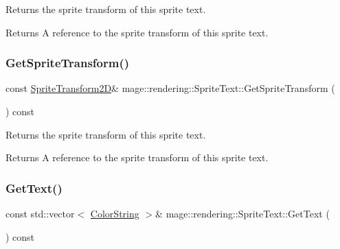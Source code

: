 Returns the sprite transform of this sprite text.

\begin{DoxyReturn}{Returns}
A reference to the sprite transform of this sprite text. 
\end{DoxyReturn}
\mbox{\label{classmage_1_1rendering_1_1_sprite_text_a6db14770931fa027175333cbf7761327}} 
\subsubsection{\texorpdfstring{Get\+Sprite\+Transform()}{GetSpriteTransform()}\hspace{0.1cm}{\footnotesize\ttfamily [2/2]}}
{\footnotesize\ttfamily const \mbox{\hyperlink{classmage_1_1_sprite_transform2_d}{Sprite\+Transform2D}}\& mage\+::rendering\+::\+Sprite\+Text\+::\+Get\+Sprite\+Transform (\begin{DoxyParamCaption}{ }\end{DoxyParamCaption}) const\hspace{0.3cm}{\ttfamily [noexcept]}}

Returns the sprite transform of this sprite text.

\begin{DoxyReturn}{Returns}
A reference to the sprite transform of this sprite text. 
\end{DoxyReturn}
\mbox{\label{classmage_1_1rendering_1_1_sprite_text_a3a07e4043ce7058cb157111738c664cb}} 
\subsubsection{\texorpdfstring{Get\+Text()}{GetText()}}
{\footnotesize\ttfamily const std\+::vector$<$ \mbox{\hyperlink{classmage_1_1rendering_1_1_color_string}{Color\+String}} $>$\& mage\+::rendering\+::\+Sprite\+Text\+::\+Get\+Text (\begin{DoxyParamCaption}{ }\end{DoxyParamCaption}) const\hspace{0.3cm}{\ttfamily [noexcept]}}

